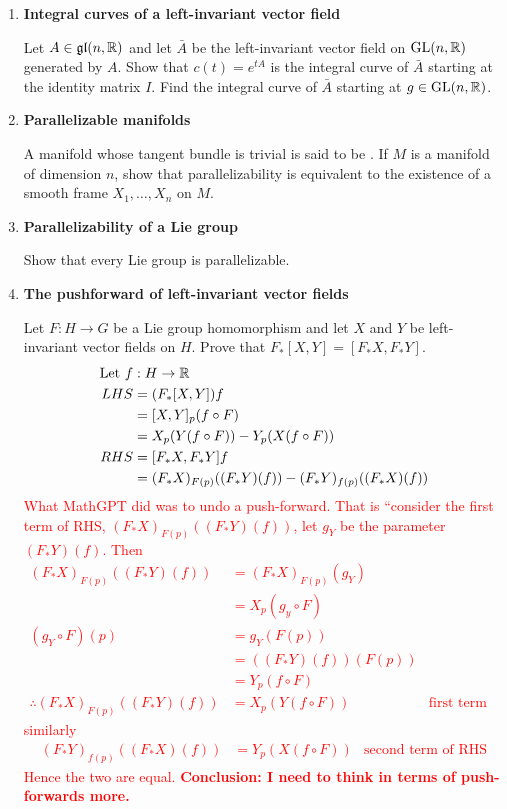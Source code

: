 \documentclass[12pt,a4paper]{report}
\newcommand{\GL}{\operatorname{GL}}
\newcommand{\GLA}{\mathfrak{gl}}
\newcommand{\RED}[1]{\textcolor{red}{#1}}
\newcommand{\BLUE}[1]{\textcolor{blue}{#1}}
\begin{document}
\begin{enumerate}[label=\textbf{16.\arabic*.}]
	\item \textbf{Integral curves of a left-invariant vector field}
	
	Let $A \in \GLA(n,\R)$ and let $\bar{A}$ be the left-invariant vector field on $\GL(n, \R)$ generated by $A$.  Show that $c(t)=e^{tA}$ is the integral curve of $\bar{A}$ starting at the identity matrix $I$.  Find the integral curve of $\bar{A}$ starting at $g \in \GL(n,\R)$.
	
	\item \textbf{Parallelizable manifolds}
	
	A manifold whose tangent bundle is trivial is said to be .  If $M$ is a manifold of dimension $n$, show that parallelizability is equivalent to the existence of a smooth frame $X_1, \dots, X_n$ on $M$.
	
	\item \textbf{Parallelizability of a Lie group}
	
	Show that every Lie group is parallelizable.
	
	\item \textbf{The pushforward of left-invariant vector fields}
	
	Let $F: H \to G$ be a Lie group homomorphism and let $X$ and $Y$ be left-invariant vector fields on $H$.  Prove that $F_*[X,Y]=[F_*X, F_*Y]$.
	\BLUE{\begin{align*}
		\text{Let } f&: H \to \mathbb{R} \\
		LHS &= (F_*[X,Y])f \\
		&= [X,Y]_p(f \circ F) \\
		&= X_p(Y(f\circ F))-Y_p(X(f\circ F)) \\
		RHS &= [F_*X, F_*Y]f \\
		&= (F_*X)_{F(p)}((F_*Y)(f))-(F_*Y)_{f(p)}((F_*X)(f))
\end{align*}	
	}\RED{What MathGPT did was to undo a push-forward.  That is ``consider the first term of RHS, $(F_*X)_{F(p)}((F_*Y)(f))$, let $g_Y$ be the parameter $(F_*Y)(f)$.  Then 
\begin{align*}
	(F_*X)_{F(p)}((F_*Y)(f)) &= (F_*X)_{F(p)}(g_Y) \\
		&= X_p(g_y \circ F) \\
	(g_Y \circ F)(p) &= g_Y(F(p)) \\
	&= ((F_*Y)(f))(F(p)) \\
	&= Y_p(f \circ F) \\
	\therefore (F_*X)_{F(p)}((F_*Y)(f)) &= X_p(Y(f\circ F)) & \text{first term of RHS}
\end{align*}similarly
\begin{align*}
	(F_*Y)_{f(p)}((F_*X)(f)) &= Y_p(X(f\circ F)) & \text{second term of RHS}
\end{align*}Hence the two are equal.  \textbf{Conclusion: I need to think in terms of push-forwards more.}
}
	

\end{enumerate}
\end{document}
